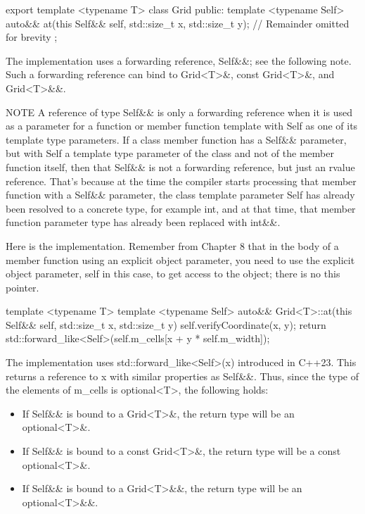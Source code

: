 \begin{cpp}
export template <typename T>
class Grid
{
    public:
        template <typename Self>
        auto&& at(this Self&& self, std::size_t x, std::size_t y);
        // Remainder omitted for brevity
};
\end{cpp}

The implementation uses a forwarding reference, Self\&\&; see the following note. Such a forwarding reference can bind to Grid<T>\&, const Grid<T>\&, and Grid<T>\&\&.

\begin{myNotic}{NOTE}
A reference of type Self\&\& is only a forwarding reference when it is used as a parameter for a function or member function template with Self as one of its template type parameters. If a class member function has a Self\&\& parameter, but with Self a template type parameter of the class and not of the member function itself, then that Self\&\& is not a forwarding reference, but just an rvalue reference. That’s because at the time the compiler starts processing that member function with a Self\&\& parameter, the class template parameter Self has already been resolved to a concrete type, for example int, and at that time, that member function parameter type has already been replaced with int\&\&.
\end{myNotic}

Here is the implementation. Remember from Chapter 8 that in the body of a member function using an explicit object parameter, you need to use the explicit object parameter, self in this case, to get access to the object; there is no this pointer.

\begin{cpp}
template <typename T>
template <typename Self>
auto&& Grid<T>::at(this Self&& self, std::size_t x, std::size_t y)
{
    self.verifyCoordinate(x, y);
    return std::forward_like<Self>(self.m_cells[x + y * self.m_width]);
}
\end{cpp}

The implementation uses std::forward\_like<Self>(x) introduced in C++23. This returns a reference to x with similar properties as Self\&\&. Thus, since the type of the elements of m\_cells is optional<T>, the following holds:

\begin{itemize}
\item
If Self\&\& is bound to a Grid<T>\&, the return type will be an optional<T>\&.

\item
If Self\&\& is bound to a const Grid<T>\&, the return type will be a const optional<T>\&.

\item
If Self\&\& is bound to a Grid<T>\&\&, the return type will be an optional<T>\&\&.
\end{itemize}

